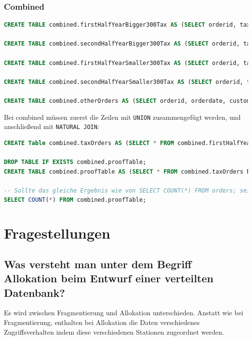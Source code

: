 \subsubsection{Combined}
\begin{lstlisting}[language=SQL]
CREATE TABLE combined.firstHalfYearBigger300Tax AS (SELECT orderid, tax, totalamount FROM orders WHERE netamount > 300 AND orderdate < '2009-07-01');

CREATE TABLE combined.secondHalfYearBigger300Tax AS (SELECT orderid, tax, totalamount FROM orders WHERE netamount > 300 AND orderdate >= '2009-07-01');

CREATE TABLE combined.firstHalfYearSmaller300Tax AS (SELECT orderid, tax, totalamount FROM orders WHERE netamount <= 300 AND orderdate < '2009-07-01');

CREATE TABLE combined.secondHalfYearSmaller300Tax AS (SELECT orderid, tax, totalamount FROM orders WHERE netamount <= 300 AND orderdate >= '2009-07-01');

CREATE TABLE combined.otherOrders AS (SELECT orderid, orderdate, customerid, netamount FROM orders);
\end{lstlisting}
Bei combined müssen zuerst die Zeilen mit \verb|UNION| zusammengefügt werden, und anschließend mit \verb|NATURAL JOIN|:

\begin{lstlisting}[language=SQL]
CREATE Table combined.taxOrders AS (SELECT * FROM combined.firstHalfYearBigger300Tax UNION SELECT * FROM combined.secondHalfYearBigger300Tax UNION SELECT * FROM combined.firstHalfYearSmaller300Tax UNION SELECT * FROM combined.secondHalfYearSmaller300Tax);

DROP TABLE IF EXISTS combined.proofTable;
CREATE TABLE combined.proofTable AS (SELECT * FROM combined.taxOrders NATURAL JOIN combined.otherOrders);

-- Sollte das gleiche Ergebnis wie von SELECT COUNT(*) FROM orders; sein
SELECT COUNT(*) FROM combined.proofTable;
\end{lstlisting}

\section{Fragestellungen}
\subsection{Was versteht man unter dem Begriff Allokation beim Entwurf einer verteilten Datenbank?}
Es wird zwischen Fragmentierung und Allokation unterschieden. Anstatt wie bei Fragmentierung, enthalten bei Allokation die Daten verschiedenes Zugriffsverhalten indem diese verschiedenen Stationen zugeordnet werden.
